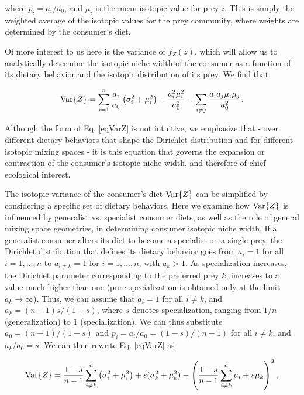 \documentclass[11pt]{article}
\begin{document}
\noindent where $p_i = a_i/a_0$, and $\mu_i$ is the mean isotopic value for prey $i$.
This is simply the weighted average of the isotopic values for the prey community, where weights are determined by the consumer's diet.

Of more interest to us here is the variance of $f_Z(z)$, which will allow us to analytically determine the isotopic niche width of the consumer as a function of its dietary behavior and the isotopic distribution of its prey.
We find that

\begin{equation}
\label{eqVarZ}
  {\rm Var}\{Z\} = \sum_{i=1}^n \frac{a_i}{a_0}\left(\sigma_i^2 + \mu_i^2\right) - \frac{a_i^2\mu_i^2}{a_0^2}-\sum_{i \neq j}\frac{a_i a_j \mu_i \mu_j}{a_0^2}.
\end{equation}

\noindent Although the form of Eq. \ref{eqVarZ} is not intuitive, we emphasize that - over different dietary behaviors that shape the Dirichlet distribution and for different isotopic mixing spaces - it is this equation that governs the expansion or contraction of the consumer's isotopic niche width, and therefore of chief ecological interest.

The isotopic variance of the consumer's diet ${\rm Var}\{Z\}$ can be simplified by considering a specific set of dietary behaviors.
Here we examine how ${\rm Var}\{Z\}$ is influenced by generalist vs. specialist consumer diets, as well as the role of general mixing space geometries, in determining consumer isotopic niche width.
If a generalist consumer alters its diet to become a specialist on a single prey, the Dirichlet distribution that defines its dietary behavior goes from $a_i=1$ for all $i=1,...,n$ to $a_{i \neq k}=1$ for $i=1,...,n$, with $a_k>1$.
As specialization increases, the Dirichlet parameter corresponding to the preferred prey $k$, increases to a value much higher than one (pure specialization is obtained only at the limit $a_k \to \infty$).
Thus, we can assume that $a_i=1$ for all $i \neq k$, and $a_k = (n-1)s/(1-s)$, where $s$ denotes specialization, ranging from $1/n$ (generalization) to $1$ (specialization).
We can thus substitute $a_0 = (n-1)/(1-s)$ and $p_i = a_i/a_0 = (1-s)/(n-1)$ for all $i \neq k$, and $a_k/a_0 = s$.
We can then rewrite Eq. \ref{eqVarZ} as

\begin{equation}
\label{eqVarZs}
{\rm Var}\{Z\} = \frac{1-s}{n-1}\sum_{i \neq k}^n \left(\sigma_i^2 + \mu_i^2\right) + s(\sigma_k^2 + \mu_k^2) - \left(\frac{1-s}{n-1}\sum_{i \neq k}^n \mu_i + s\mu_k \right)^2,
\end{equation}
\end{document}
